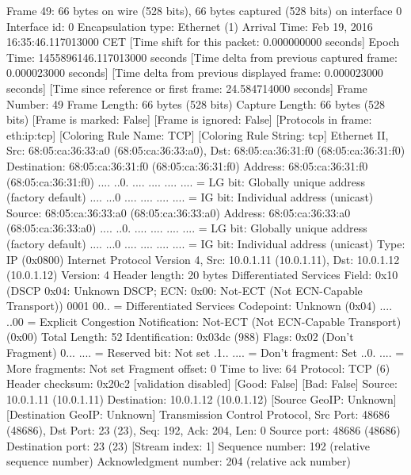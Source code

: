 Frame 49: 66 bytes on wire (528 bits), 66 bytes captured (528 bits) on interface 0
    Interface id: 0
    Encapsulation type: Ethernet (1)
    Arrival Time: Feb 19, 2016 16:35:46.117013000 CET
    [Time shift for this packet: 0.000000000 seconds]
    Epoch Time: 1455896146.117013000 seconds
    [Time delta from previous captured frame: 0.000023000 seconds]
    [Time delta from previous displayed frame: 0.000023000 seconds]
    [Time since reference or first frame: 24.584714000 seconds]
    Frame Number: 49
    Frame Length: 66 bytes (528 bits)
    Capture Length: 66 bytes (528 bits)
    [Frame is marked: False]
    [Frame is ignored: False]
    [Protocols in frame: eth:ip:tcp]
    [Coloring Rule Name: TCP]
    [Coloring Rule String: tcp]
Ethernet II, Src: 68:05:ca:36:33:a0 (68:05:ca:36:33:a0), Dst: 68:05:ca:36:31:f0 (68:05:ca:36:31:f0)
    Destination: 68:05:ca:36:31:f0 (68:05:ca:36:31:f0)
        Address: 68:05:ca:36:31:f0 (68:05:ca:36:31:f0)
        .... ..0. .... .... .... .... = LG bit: Globally unique address (factory default)
        .... ...0 .... .... .... .... = IG bit: Individual address (unicast)
    Source: 68:05:ca:36:33:a0 (68:05:ca:36:33:a0)
        Address: 68:05:ca:36:33:a0 (68:05:ca:36:33:a0)
        .... ..0. .... .... .... .... = LG bit: Globally unique address (factory default)
        .... ...0 .... .... .... .... = IG bit: Individual address (unicast)
    Type: IP (0x0800)
Internet Protocol Version 4, Src: 10.0.1.11 (10.0.1.11), Dst: 10.0.1.12 (10.0.1.12)
    Version: 4
    Header length: 20 bytes
    Differentiated Services Field: 0x10 (DSCP 0x04: Unknown DSCP; ECN: 0x00: Not-ECT (Not ECN-Capable Transport))
        0001 00.. = Differentiated Services Codepoint: Unknown (0x04)
        .... ..00 = Explicit Congestion Notification: Not-ECT (Not ECN-Capable Transport) (0x00)
    Total Length: 52
    Identification: 0x03dc (988)
    Flags: 0x02 (Don't Fragment)
        0... .... = Reserved bit: Not set
        .1.. .... = Don't fragment: Set
        ..0. .... = More fragments: Not set
    Fragment offset: 0
    Time to live: 64
    Protocol: TCP (6)
    Header checksum: 0x20c2 [validation disabled]
        [Good: False]
        [Bad: False]
    Source: 10.0.1.11 (10.0.1.11)
    Destination: 10.0.1.12 (10.0.1.12)
    [Source GeoIP: Unknown]
    [Destination GeoIP: Unknown]
Transmission Control Protocol, Src Port: 48686 (48686), Dst Port: 23 (23), Seq: 192, Ack: 204, Len: 0
    Source port: 48686 (48686)
    Destination port: 23 (23)
    [Stream index: 1]
    Sequence number: 192    (relative sequence number)
    Acknowledgment number: 204    (relative ack number)

